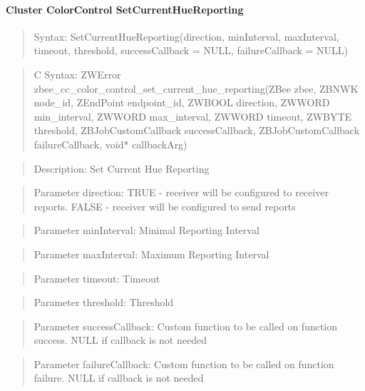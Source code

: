\paragraph{Cluster ColorControl SetCurrentHueReporting}
\begin{quote}Syntax: SetCurrentHueReporting(direction, minInterval, maxInterval, timeout, threshold, successCallback = NULL, failureCallback = NULL)\end{quote}
\begin{quote}C Syntax: ZWError zbee\_cc\_color\_control\_set\_current\_hue\_reporting(ZBee zbee, ZBNWK node\_id, ZEndPoint endpoint\_id, ZWBOOL direction, ZWWORD min\_interval, ZWWORD max\_interval, ZWWORD timeout, ZWBYTE threshold, ZBJobCustomCallback successCallback, ZBJobCustomCallback failureCallback, void* callbackArg)\end{quote}
\begin{quote}Description: Set Current Hue Reporting\end{quote}
\begin{quote}Parameter direction: TRUE  - receiver will be configured to receiver reports. FALSE - receiver will be configured to send reports\end{quote}
\begin{quote}Parameter minInterval: Minimal Reporting Interval\end{quote}
\begin{quote}Parameter maxInterval: Maximum Reporting Interval\end{quote}
\begin{quote}Parameter timeout: Timeout\end{quote}
\begin{quote}Parameter threshold: Threshold\end{quote}
\begin{quote}Parameter successCallback: Custom function to be called on function success. NULL if callback is not needed\end{quote}
\begin{quote}Parameter failureCallback: Custom function to be called on function failure. NULL if callback is not needed\end{quote}


